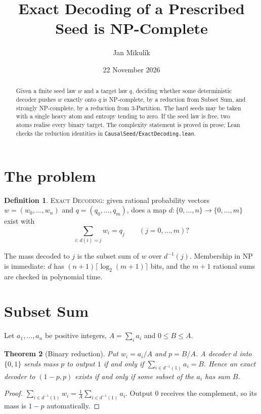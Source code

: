 \documentclass[11pt,a4paper]{article}
\title{\textbf{Exact Decoding of a Prescribed Seed is NP-Complete}}
\author{Jan Mikulík}
\date{22 November 2026}
\newtheorem{theorem}{Theorem}
\theoremstyle{definition}
\newtheorem{definition}[theorem]{Definition}
\theoremstyle{remark}
\begin{document}
\maketitle

\begin{abstract}
Given a finite seed law \(w\) and a target law \(q\), deciding whether some
deterministic decoder pushes \(w\) exactly onto \(q\) is NP-complete, by a
reduction from Subset Sum, and strongly NP-complete, by a reduction from
3-Partition. The hard seeds may be taken with a single heavy atom and entropy
tending to zero. If the seed law is free, two atoms realise every binary target.
The complexity statement is proved in prose; Lean checks the reduction
identities in \texttt{CausalSeed/ExactDecoding.lean}.
\end{abstract}

\section{The problem}

\begin{definition}
\textsc{Exact Decoding}: given rational probability vectors
\(w=(w_0,\dots,w_n)\) and \(q=(q_0,\dots,q_m)\), does a map
\(d\colon\{0,\dots,n\}\to\{0,\dots,m\}\) exist with
\[
  \sum_{i:\,d(i)=j} w_i = q_j \qquad (j=0,\dots,m)?
\]
\end{definition}

The mass decoded to \(j\) is the subset sum of \(w\) over \(d^{-1}(j)\).
Membership in NP is immediate: \(d\) has \((n+1)\lceil\log_2(m+1)\rceil\) bits,
and the \(m+1\) rational sums are checked in polynomial time.

\section{Subset Sum}

Let \(a_1,\dots,a_n\) be positive integers, \(A=\sum_i a_i\) and \(0\le B\le A\).

\begin{theorem}[Binary reduction]
Put \(w_i=a_i/A\) and \(p=B/A\). A decoder \(d\) into \(\{0,1\}\) sends mass \(p\)
to output \(1\) if and only if \(\sum_{i\in d^{-1}(1)}a_i=B\). Hence an exact
decoder to \((1-p,p)\) exists if and only if some subset of the \(a_i\) has
sum \(B\).
\end{theorem}

\begin{proof}
\(\sum_{i\in d^{-1}(1)}w_i=\frac1A\sum_{i\in d^{-1}(1)}a_i\). Output \(0\) receives
the complement, so its mass is \(1-p\) automatically.
\end{proof}
\end{document}
